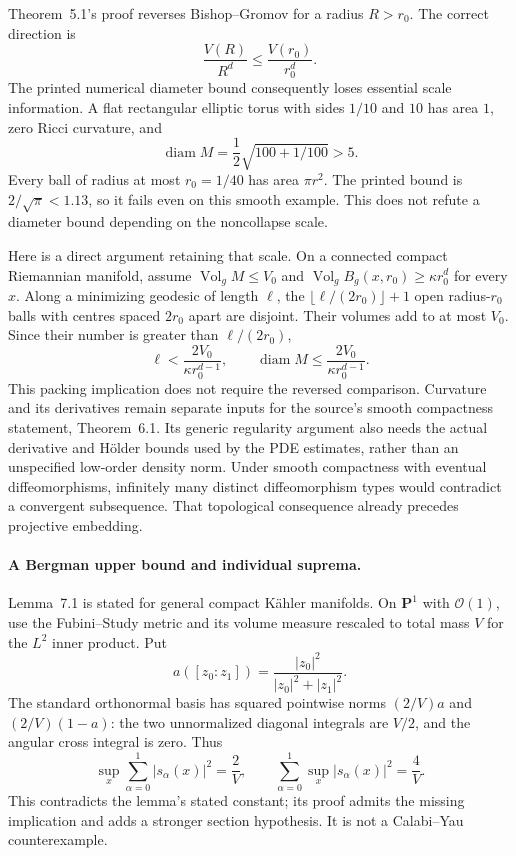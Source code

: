 Theorem~5.1's proof reverses Bishop--Gromov for a radius \(R>r_0\).
The correct direction is
\[
 \frac{V(R)}{R^d}\leq\frac{V(r_0)}{r_0^d}.
\]
The printed numerical diameter bound consequently loses essential
scale information. A flat rectangular elliptic torus with sides
\(1/10\) and \(10\) has area \(1\), zero Ricci curvature, and
\[
 \operatorname{diam}M=\frac12\sqrt{100+1/100}>5.
\]
Every ball of radius at most \(r_0=1/40\) has area \(\pi r^2\).
The printed bound is \(2/\sqrt\pi<1.13\), so it fails even on
this smooth example. This does not refute a diameter bound depending
on the noncollapse scale.

Here is a direct argument retaining that scale. On a connected
compact Riemannian manifold, assume
\(\operatorname{Vol}_g M\leq V_0\) and
\(\operatorname{Vol}_g B_g(x,r_0)\geq\kappa r_0^d\) for every \(x\).
Along a minimizing geodesic of length \(\ell\), the
\(\lfloor\ell/(2r_0)\rfloor+1\) open radius-\(r_0\) balls with centres
spaced \(2r_0\) apart are disjoint. Their volumes add to at most \(V_0\).
Since their number is greater than \(\ell/(2r_0)\),
\[
 \ell<\frac{2V_0}{\kappa r_0^{d-1}},\qquad
 \operatorname{diam}M\leq\frac{2V_0}{\kappa r_0^{d-1}}.
\]
This packing implication does not require the reversed comparison.
Curvature and its derivatives remain separate inputs for the source's
smooth compactness statement, Theorem~6.1. Its generic regularity
argument also needs the actual derivative and H\"older bounds used
by the PDE estimates, rather than an unspecified low-order density
norm. Under smooth compactness with eventual diffeomorphisms, infinitely
many distinct diffeomorphism types would contradict a convergent
subsequence. That topological consequence already precedes projective
embedding.

\paragraph{A Bergman upper bound and individual suprema.}
Lemma~7.1 is stated for general compact K\"ahler manifolds.
On \(\mathbf P^1\) with \(\mathcal O(1)\), use the Fubini--Study
metric and its volume measure rescaled to total mass \(V\) for
the \(L^2\) inner product. Put
\[
 a([z_0:z_1])=\frac{|z_0|^2}{|z_0|^2+|z_1|^2}.
\]
The standard orthonormal basis has squared pointwise norms
\((2/V)a\) and \((2/V)(1-a)\): the two unnormalized diagonal
integrals are \(V/2\), and the angular cross integral is zero.
Thus
\[
 \sup_x\sum_{\alpha=0}^1|s_\alpha(x)|^2=\frac2V,\qquad
 \sum_{\alpha=0}^1\sup_x|s_\alpha(x)|^2=\frac4V.
\]
This contradicts the lemma's stated constant; its proof admits the
missing implication and adds a stronger section hypothesis.
It is not a Calabi--Yau counterexample.

